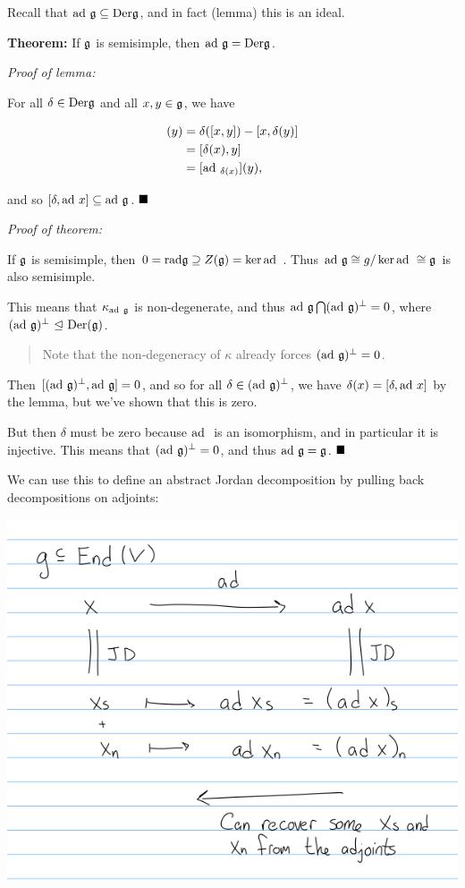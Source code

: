 Recall that \(\mathrm{ad}~ {\mathfrak{g}} \subseteq \mathrm{Der} {\mathfrak{g}}\), and in fact
(lemma) this is an ideal.

\textbf{Theorem:} If \({\mathfrak{g}}\) is semisimple, then
\(\mathrm{ad}~ {\mathfrak{g}} = \mathrm{Der} {\mathfrak{g}}\).

\emph{Proof of lemma:}

For all \(\delta \in \mathrm{Der} {\mathfrak{g}}\) and all \(x,y \in {\mathfrak{g}}\), we
have

\begin{align*}
[\delta, \ad_x](y) &= \delta([x, y]) - [x, \delta(y)] \\
&= [\delta(x), y] \\
&= [\ad_{\delta(x)}](y)
,\end{align*}

and so \([\delta, \mathrm{ad}~ x] \subseteq \mathrm{ad}~ {\mathfrak{g}}\). \(\qed\)

\emph{Proof of theorem:}

If \({\mathfrak{g}}\) is semisimple, then
\(0 = \mathrm{rad} {\mathfrak{g}} \supseteq Z({\mathfrak{g}}) = \ker \mathrm{ad}~\). Thus
\(\mathrm{ad}~ {\mathfrak{g}} \cong g/\ker \mathrm{ad}~ \cong {\mathfrak{g}}\) is also semisimple.

This means that \(\kappa_{\mathrm{ad}~ {\mathfrak{g}}}\) is non-degenerate, and thus
\(\mathrm{ad}~ {\mathfrak{g}} \bigcap (\mathrm{ad}~ {\mathfrak{g}})^\perp = 0\), where
\((\mathrm{ad}~ {\mathfrak{g}})^\perp {~\trianglelefteq~} \mathrm{Der}({\mathfrak{g}})\).

\begin{quote}
Note that the non-degeneracy of \(\kappa\) already forces
\((\mathrm{ad}~ {\mathfrak{g}})^\perp = 0\).
\end{quote}

Then \([(\mathrm{ad}~ {\mathfrak{g}})^\perp, \mathrm{ad}~ {\mathfrak{g}}] = 0\), and so for all
\(\delta \in (\mathrm{ad}~ {\mathfrak{g}})^\perp\), we have
\(\delta(x) = [\delta, \mathrm{ad}~ x]\) by the lemma, but we've shown that this
is zero.

But then \(\delta\) must be zero because \(\mathrm{ad}~\) is an isomorphism, and
in particular it is injective. This means that
\((\mathrm{ad}~ {\mathfrak{g}})^\perp = 0\), and thus \(\mathrm{ad}~ {\mathfrak{g}} = {\mathfrak{g}}\). \(\qed\)

We can use this to define an abstract Jordan decomposition by pulling
back decompositions on adjoints:

\includegraphics{figures/2019-09-09-10:01.png}\\

